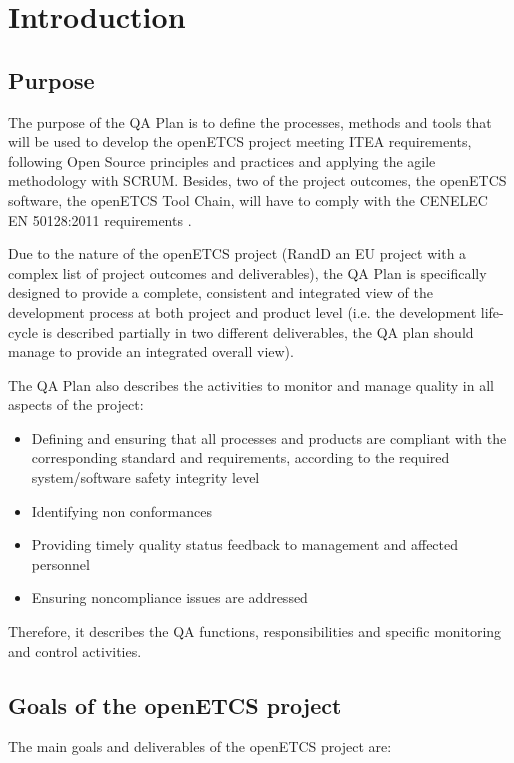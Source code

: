 \documentclass{template/openetcs_article}
\begin{document}
\section[Introduction]{Introduction}


\subsection{Purpose}

The purpose of the QA Plan is to define the processes, methods and tools that will be used to develop the openETCS project meeting ITEA requirements, following Open Source principles and practices and applying the agile methodology with SCRUM. Besides, two of the project outcomes, the openETCS software, the openETCS Tool Chain, will have to comply with the CENELEC EN 50128:2011 requirements \citep{EN50128}.

Due to the nature of the openETCS project (\gls{RandD} an EU project with a complex list of project outcomes and deliverables), the QA Plan is specifically designed to provide a complete, consistent and integrated view of the development process at both project and product level (i.e. the development life-cycle is described partially in two different deliverables, the QA plan should manage to provide an integrated overall view).

The QA Plan also describes the activities to monitor and manage quality in all aspects of the project:

\begin{itemize}
\item Defining and ensuring that all processes and products are compliant with the corresponding standard and requirements, according to the required system/software safety integrity level
\item Identifying non conformances      
\item Providing timely quality status feedback to management and affected personnel
\item Ensuring noncompliance issues are addressed
\end{itemize}

Therefore, it describes the QA functions, responsibilities and specific monitoring and control activities.


\subsection{Goals of the openETCS project}

The main goals and deliverables of the openETCS project are:
\end{document}
